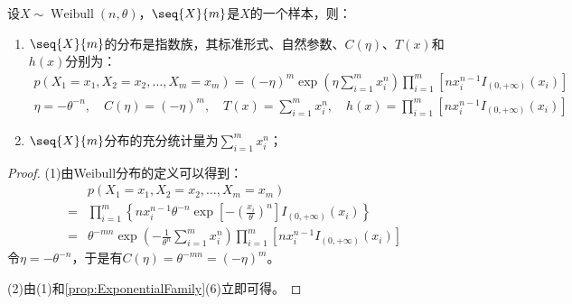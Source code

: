 \begin{theorem}
	设$X\sim\operatorname{Weibull}(n,\theta)$，$\seq{X}{m}$是$X$的一个样本，则：
	\begin{enumerate}
		\item $\seq{X}{m}$的分布是指数族，其标准形式、自然参数、$C(\eta)$、$T(x)$和$h(x)$分别为：
		\begin{gather*}
			p(X_1=x_1,X_2=x_2,\dots,X_m=x_m)=(-\eta)^{m}\exp\left(\eta\sum_{i=1}^{m}x_i^n\right)\prod_{i=1}^{m}\left[nx_i^{n-1}I_{(0,+\infty)}(x_i)\right] \\
			\eta=-\theta^{-n},\quad C(\eta)=(-\eta)^{m},\quad
			T(x)=\sum_{i=1}^{m}x_i^n,\quad h(x)=\prod_{i=1}^{m}\left[nx_i^{n-1}I_{(0,+\infty)}(x_i)\right]
		\end{gather*}
		\item $\seq{X}{m}$分布的充分统计量为$\sum\limits_{i=1}^{m}x_i^n$；
	\end{enumerate}
\end{theorem}
\begin{proof}
	(1)由Weibull分布的定义可以得到：
	\begin{align*}
		&p(X_1=x_1,X_2=x_2,\dots,X_m=x_m) \\
		=&\prod_{i=1}^{m}\left\{nx_i^{n-1}\theta^{-n}\exp\left[-\left(\frac{x_i}{\theta}\right)^n\right]I_{(0,+\infty)}(x_i)\right\} \\
		=&\theta^{-mn}\exp\left(-\frac{1}{\theta^n}\sum_{i=1}^{m}x_i^n\right)\prod_{i=1}^{m}\left[nx_i^{n-1}I_{(0,+\infty)}(x_i)\right]
	\end{align*}
	令$\eta=-\theta^{-n}$，于是有$C(\eta)=\theta^{-mn}=(-\eta)^{m}$。\par
	(2)由(1)和\cref{prop:ExponentialFamily}(6)立即可得。
\end{proof}

